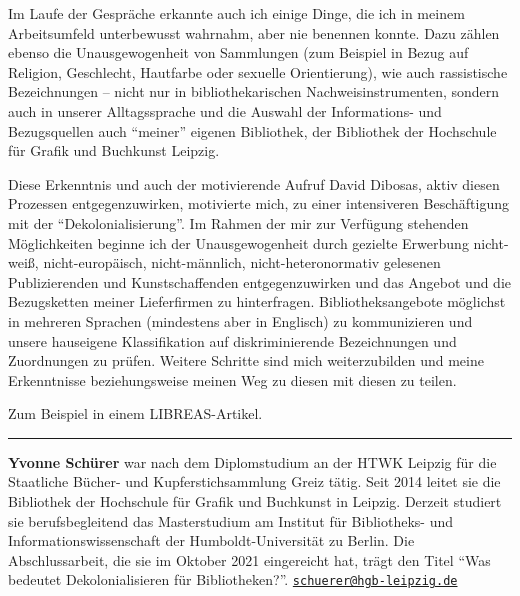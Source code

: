 \documentclass[a4paper,
fontsize=11pt,
oneside,
numbers=noperiodatend,
parskip=half-,
bibliography=totoc,
final
]{scrartcl}
\begin{document}
Im Laufe der Gespräche erkannte auch ich einige Dinge, die ich in meinem
Arbeitsumfeld unterbewusst wahrnahm, aber nie benennen konnte. Dazu
zählen ebenso die Unausgewogenheit von Sammlungen (zum Beispiel in Bezug
auf Religion, Geschlecht, Hautfarbe oder sexuelle Orientierung), wie
auch rassistische Bezeichnungen -- nicht nur in bibliothekarischen
Nachweisinstrumenten, sondern auch in unserer Alltagssprache und die
Auswahl der Informations- und Bezugsquellen auch \enquote{meiner}
eigenen Bibliothek, der Bibliothek der Hochschule für Grafik und
Buchkunst Leipzig.

Diese Erkenntnis und auch der motivierende Aufruf David Dibosas, aktiv
diesen Prozessen entgegenzuwirken, motivierte mich, zu einer
intensiveren Beschäftigung mit der \enquote{Dekolonialisierung}. Im
Rahmen der mir zur Verfügung stehenden Möglichkeiten beginne ich der
Unausgewogenheit durch gezielte Erwerbung nicht-weiß, nicht-europäisch,
nicht-männlich, nicht-heteronormativ gelesenen Publizierenden und
Kunstschaffenden entgegenzuwirken und das Angebot und die Bezugsketten
meiner Lieferfirmen zu hinterfragen. Bibliotheksangebote möglichst in
mehreren Sprachen (mindestens aber in Englisch) zu kommunizieren und
unsere hauseigene Klassifikation auf diskriminierende Bezeichnungen und
Zuordnungen zu prüfen. Weitere Schritte sind mich weiterzubilden und
meine Erkenntnisse beziehungsweise meinen Weg zu diesen mit diesen zu
teilen.

Zum Beispiel in einem LIBREAS-Artikel.

\begin{center}\rule{0.5\linewidth}{0.5pt}\end{center}

\textbf{Yvonne Schürer} war nach dem Diplomstudium an der HTWK Leipzig
für die Staatliche Bücher- und Kupferstichsammlung Greiz tätig. Seit
2014 leitet sie die Bibliothek der Hochschule für Grafik und Buchkunst
in Leipzig. Derzeit studiert sie berufsbegleitend das Masterstudium am
Institut für Bibliotheks- und Informationswissenschaft der
Humboldt-Universität zu Berlin. Die Abschlussarbeit, die sie im Oktober
2021 eingereicht hat, trägt den Titel \enquote{Was bedeutet Dekolonialisieren
für Bibliotheken?}. \href{mailto:schuerer@hgb-leipzig.de}{\nolinkurl{schuerer@hgb-leipzig.de}}
\end{document}
